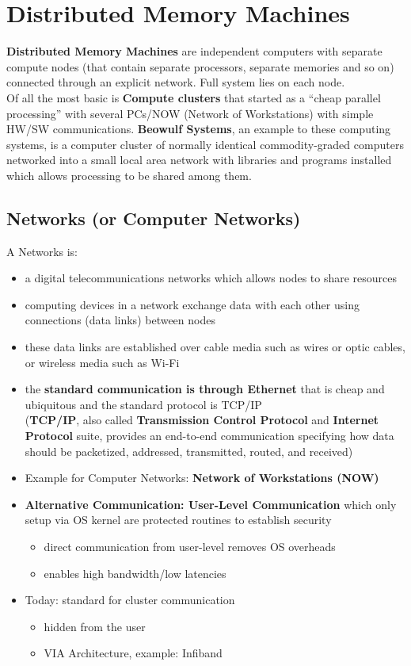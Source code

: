 \documentclass[12pt, a4paper]{report}
\begin{document}
\section{Distributed Memory Machines}
{\bfseries{Distributed Memory Machines}} are independent computers with separate compute nodes (that contain separate processors, separate memories and so on)
connected through an explicit network. Full system lies on each node.\\
Of all the most basic is {\bfseries{Compute clusters}} that started as a ``cheap parallel processing'' with several PCs/NOW (Network of Workstations) with simple
HW/SW communications. {\bfseries{Beowulf Systems}}, an example to these computing systems, is a computer cluster of normally identical commodity-graded computers
networked into a small local area network with libraries and programs installed which allows processing to be shared among them.

\subsection{Networks (or Computer Networks)}
A Networks is:
\begin{itemize}
    \item a digital telecommunications networks which allows nodes to share resources
    \item computing devices in a network exchange data with each other using connections (data links) between nodes
    \item these data links are established over cable media such as wires or optic cables, or wireless media such as Wi-Fi
    \item the {\bfseries{standard communication is through Ethernet}} that is cheap and ubiquitous and the standard protocol is TCP/IP\\
          ({\bfseries{TCP/IP}}, also called {\bfseries{Transmission Control Protocol}} and {\bfseries{Internet Protocol}} suite, provides an end-to-end
          communication specifying how data should be packetized, addressed, transmitted, routed, and received)
    \item Example for Computer Networks: {\bfseries{Network of Workstations (NOW)}}
    \item {\bfseries{Alternative Communication: User-Level Communication}} which only setup via OS kernel are protected routines to establish security
    \begin{itemize}
        \item direct communication from user-level removes OS overheads
        \item enables high bandwidth/low latencies
    \end{itemize}
    \item Today: standard for cluster communication
    \begin{itemize}
        \item hidden from the user
        \item VIA Architecture, example: Infiband
    \end{itemize}
\end{itemize}
\end{document}
